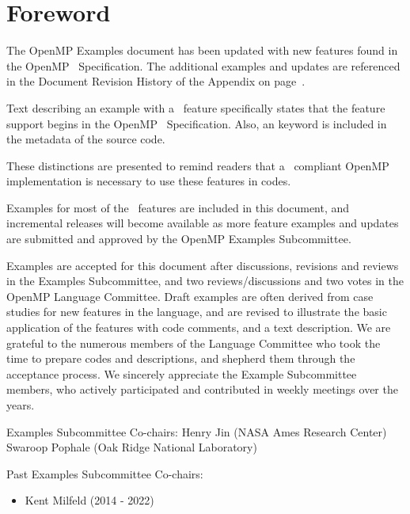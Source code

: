 \chapter*{Foreword}
\label{chap:foreword}

The OpenMP Examples document has been updated with new features
found in the OpenMP \PVER\ Specification. The additional examples and updates
are referenced in the Document Revision History of the Appendix on page~\pageref{chap:history}.

Text describing an example with a \PVER\ feature specifically states
that the feature support begins in the OpenMP \PVER\ Specification.  Also,
an  keyword is included in the  metadata of the source code.

These distinctions are presented to remind readers that a \PVER\ compliant 
OpenMP implementation is necessary to use these features in codes.

Examples for most of the \PVER\ features are included in this document,
and incremental releases will become available as more feature examples
and updates are submitted and approved by the OpenMP Examples Subcommittee.

Examples are accepted for this document after discussions, revisions and reviews
in the Examples Subcommittee, and two reviews/discussions and two votes
in the OpenMP Language Committee.
Draft examples are often derived from case studies for new features in the language,
and are revised to illustrate the basic application of the features with code comments,
and a text description. We are grateful to the numerous members of the Language Committee 
who took the time to prepare codes and descriptions, and shepherd them through
the acceptance process. We sincerely appreciate the Example Subcommittee members, who 
actively participated and contributed in weekly meetings over the years.

\bigskip
Examples Subcommittee Co-chairs: \smallskip\linebreak
Henry Jin (\textsc{NASA} Ames Research Center) \linebreak
Swaroop Pophale (Oak Ridge National Laboratory)

\bigskip
\bigskip
Past Examples Subcommittee Co-chairs:
\begin{itemize}
\item Kent Milfeld (2014 - 2022)
\end{itemize}


